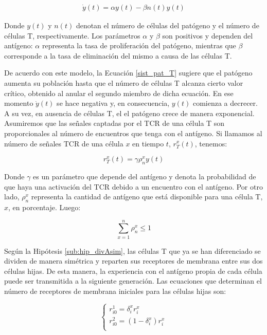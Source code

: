 \begin{equation}
	\label{sist_pat_T}
	\begin{array}{ll}
	\dot{y}(t) = \alpha y(t) - \beta n(t)y(t)
	\end{array}
\end{equation} 

Donde $y(t)$ y $n(t)$ denotan el número de células del patógeno y el número de células T, respectivamente. Los parámetros $\alpha$ y $\beta$ son positivos y dependen del antígeno: $\alpha$ representa la tasa de proliferación del patógeno, mientras que $\beta$ corresponde a la tasa de eliminación del mismo a causa de las células T.

De acuerdo con este modelo, la Ecuación \ref{sist_pat_T} sugiere que el patógeno aumenta su población hasta que el número de células T alcanza cierto valor crítico, obtenido al anular el segundo miembro de dicha ecuación. En ese momento $\dot{y}(t)$ se hace negativa y, en consecuencia, $y(t)$ comienza a decrecer. A su vez, en ausencia de células T, el el patógeno crece de manera exponencial. Asumiremos que las señales captadas por el TCR de una célula T son proporcionales al número de encuentros que tenga con el antígeno. Si llamamos al número de señales TCR de una célula $x$ en tiempo $t$, $r_{T}^{x}(t)$, tenemos:

\begin{equation}
	\label{ec:rhotau}
	r_{T}^{x}(t) = \gamma\rho_{n}^{x}y(t)
\end{equation}

Donde $\gamma$ es un parámetro que depende del antígeno y denota la probabilidad de que haya una activación del TCR debido a un encuentro con el antígeno. Por otro lado, $\rho_{n}^{x}$ representa la cantidad de antígeno que está disponible para una célula T, $x$, en porcentaje. Luego:

\begin{equation}
	\sum_{x=1}^{n} \rho_{n}^{x} \leq 1
\end{equation}

Según la Hipótesis \ref{sub:hip_divAsim}, las células T que ya se han diferenciado se dividen de manera simétrica y reparten sus receptores de membrana entre sus dos células hijas. De esta manera, la experiencia con el antígeno propia de cada célula puede ser transmitida a la siguiente generación. Las ecuaciones que determinan el número de receptores de membrana iniciales para las células hijas son:

\begin{equation}
	\label{sist:div_sim}
	\left\{ \begin{array}{l}
	r_{i0}^{1}= \delta_{i}^{x} r_{i}^{x}\\
	r_{i0}^{2}= (1-\delta_{i}^{x}) r_{i}^{x} \\
	\end{array}
	\right.
\end{equation}


